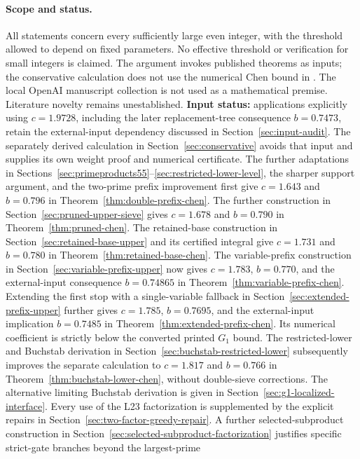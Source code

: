 \documentclass[11pt]{article}
\begin{document}
\paragraph{Scope and status.}
All statements concern every sufficiently large even integer, with the
threshold allowed to depend on fixed parameters. No effective threshold or
verification for small integers is claimed. The argument invokes published
theorems as inputs; the conservative calculation does not use the numerical Chen bound in
\cite{Li2026}. The local OpenAI manuscript collection is not used as a
mathematical premise. Literature novelty remains unestablished.
\textbf{Input status:} applications explicitly using $c=1.9728$,
including the later replacement-tree consequence $b=0.7473$, retain
the external-input dependency discussed in Section~\ref{sec:input-audit}.
The separately derived calculation in Section~\ref{sec:conservative}
avoids that input and supplies its own weight proof and numerical
certificate. The further adaptations in
Sections~\ref{sec:primeproducts55}--\ref{sec:restricted-lower-level},
the sharper support argument, and the two-prime prefix improvement
first give $c=1.643$ and $b=0.796$ in
Theorem~\ref{thm:double-prefix-chen}. The further construction in
Section~\ref{sec:pruned-upper-sieve} gives $c=1.678$ and $b=0.790$
in Theorem~\ref{thm:pruned-chen}. The retained-base construction in
Section~\ref{sec:retained-base-upper} and its certified integral
give $c=1.731$ and $b=0.780$ in
Theorem~\ref{thm:retained-base-chen}. The variable-prefix construction
in Section~\ref{sec:variable-prefix-upper} now gives $c=1.783$,
$b=0.770$, and the external-input consequence $b=0.74865$ in
Theorem~\ref{thm:variable-prefix-chen}. Extending the first stop with
a single-variable fallback in Section~\ref{sec:extended-prefix-upper}
further gives $c=1.785$, $b=0.7695$, and the external-input implication
$b=0.7485$ in Theorem~\ref{thm:extended-prefix-chen}. Its numerical
coefficient is strictly below the converted printed $G_1$ bound.
The restricted-lower and Buchstab derivation in
Section~\ref{sec:buchstab-restricted-lower} subsequently improves
the separate calculation to $c=1.817$ and $b=0.766$ in
Theorem~\ref{thm:buchstab-lower-chen}, without double-sieve corrections. The alternative
limiting Buchstab derivation is given in
Section~\ref{sec:g1-localized-interface}. Every use of the L23
factorization is supplemented by the explicit repairs in
Section~\ref{sec:two-factor-greedy-repair}. A further selected-subproduct
construction in Section~\ref{sec:selected-subproduct-factorization}
justifies specific strict-gate branches beyond the largest-prime
\end{document}
